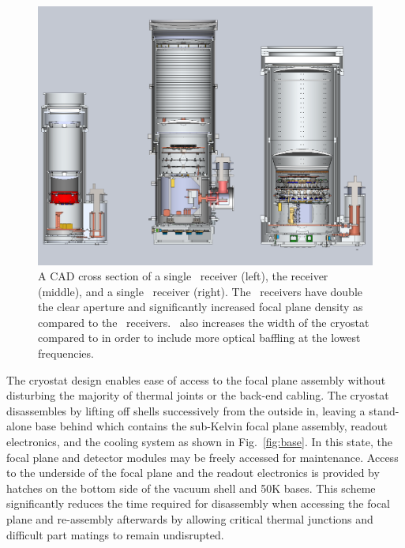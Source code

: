 \documentclass[]{spie}  %
\begin{document}
\begin{figure} [hb]
	\begin{center}
		\includegraphics[scale=0.35]{BA_B3_spud.PDF}
	\end{center}
	\caption{A CAD cross section of a single \keckarray\ receiver (left), the
	 receiver (middle), and a single
	\biceparray\ receiver (right). The \biceparray\ receivers have double
	the clear aperture and significantly increased focal plane density as
	compared to the \keckarray\ receivers. \biceparray\ also increases the
	width of the cryostat compared to  in order to include more optical baffling at the
	lowest frequencies.}
	\label{fig:bavskeck}
\end{figure}







The cryostat design enables ease of access to the focal plane assembly without
disturbing the majority of thermal joints or the back-end cabling. The
cryostat disassembles by lifting off shells successively
from the outside in, leaving a stand-alone base behind which contains the
sub-Kelvin focal plane assembly, readout electronics, and the cooling system as shown in
Fig.~\ref{fig:base}. In this state, the focal plane and detector modules may be
freely accessed for maintenance. Access to the
underside of the focal plane and the readout electronics is provided by
hatches on the bottom side of the vacuum shell and 50K bases. This scheme
significantly reduces the time required for disassembly when accessing the
focal plane and re-assembly afterwards by allowing critical thermal junctions
and difficult part matings to remain undisrupted.
\end{document}
